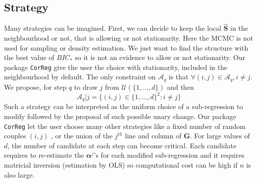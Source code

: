 \documentclass[12pt,a4paper]{report}
\begin{document}
		\subsection{Strategy}
			Many strategies can be imagined. First, we can decide to keep the local $\hat{\boldsymbol{S}}$ in the neighbourhood or not, that is allowing or not stationarity. Here the MCMC is not used for sampling or density estimation. We just want to find the structure with the best value of $BIC_*$ so it is not an evidence to allow or not stationarity. Our package {\tt CorReg} give the user the choice with stationarity,  included in the neighbourhood by default.
		The only constraint on $\mathcal{A}_q$ is that $\forall (i,j) \in \mathcal{A}_q, i\neq j$.				
		We propose, for step $q$ to draw $j$ from $\mathcal{U}(\{1,\dots,d\})$ and then 
		\begin{equation}
			\mathcal{A}_{q}|j=\{ (i,j) \in  \{1,\dots,d\}^2 :i \neq j \}
		\end{equation}
			Such a strategy can be interpreted as the uniform choice of a sub-regression to modify followed by the proposal of each possible unary change.
			Our package {\tt CorReg} let the user choose many other strategies like a fixed number of random couples $(i,j)$ , or the union of the $j^{th}$ line and column of $\boldsymbol{G}$. For large values of $d$, the number of candidate at each step can become critical. Each candidate requires to re-estimate the $\boldsymbol{\alpha}^j$'s for each modified sub-regression and it requires matricial inversion (estimation by OLS) so computational cost can be high if $n$ is also large.
\end{document}
